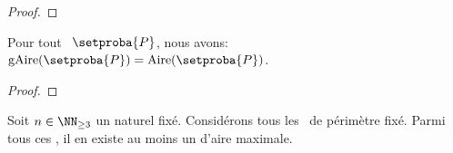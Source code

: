 \begin{proof}
\end{proof}
	
	


\begin{fact}
	Pour tout \ngone\ $\setproba{P}$, nous avons: $\garea{\setproba{P}} = \area{\setproba{P}}$.
\end{fact}


\begin{proof}
\end{proof}




\begin{fact} \label{suff-cond}
	Soit $n \in \NN_{\geq3}$ un naturel fixé.
	Considérons tous les \ngones\ de périmètre fixé. Parmi tous ces \ngones, il en existe au moins un d'aire maximale.
\end{fact}


